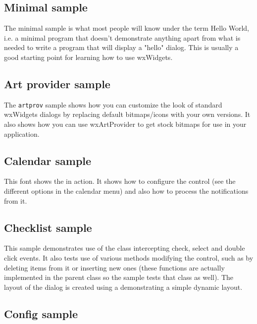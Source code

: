 \subsection{Minimal sample}\label{sampleminimal}

The minimal sample is what most people will know under the term Hello World,
i.e. a minimal program that doesn't demonstrate anything apart from what is
needed to write a program that will display a "hello" dialog. This is usually
a good starting point for learning how to use wxWidgets.


\subsection{Art provider sample}\label{sampleartprovider}

The {\tt artprov} sample shows how you can customize the look of standard
wxWidgets dialogs by replacing default bitmaps/icons with your own versions.
It also shows how you can use wxArtProvider to
get stock bitmaps for use in your application.


\subsection{Calendar sample}\label{samplecalendar}

This font shows the  in action. It
shows how to configure the control (see the different options in the calendar
menu) and also how to process the notifications from it.


\subsection{Checklist sample}\label{samplechecklist}

This sample demonstrates use of the 
class intercepting check, select and double click events. It also tests
use of various methods modifying the control, such as by deleting items
from it or inserting new ones (these functions are actually implemented in
the parent class  so the sample tests that class
as well). The layout of the dialog is created using a 
demonstrating a simple dynamic layout.


\subsection{Config sample}\label{sampleconfig}

